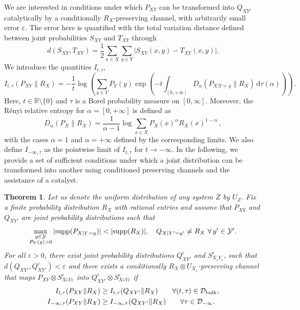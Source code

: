 \documentclass[aps,pra,11pt,onecolumn,nofootinbib,tightenlines]{revtex4-2}
\newtheorem{theorem}{Theorem}[section]
\theoremstyle{definition}
\newcommand{\R}{\mathbb{R}}
\newcommand{\mc}[1]{\mathcal{#1}}
\begin{document}
We are interested in conditions under which \(P_{XY}\) can be transformed into \(Q_{XY'}\) catalytically by a conditionally \(R_X\)-preserving channel, with arbitrarily small error $\varepsilon$.
The error here is quantified with the total variation distance defined between joint probabilities $S_{XY}$ and $T_{XY}$ through
\begin{equation}
d(S_{XY},T_{XY})=\frac{1}{2}\sum_{x\in X}\sum_{y\in Y}\big|S_{XY}(x,y)-T_{XY}(x,y)\big|.
\end{equation}
We introduce the quantities $I_{t,\tau}$,
\begin{equation}
I_{t,\tau}(P_{XY}\|R_X)=-\frac{1}{t}\log{\left(\sum_{y\in Y}P_Y(y)\exp{\left(-t\int_{[0,+\infty]}D_\alpha(P_{X|Y=y}\|R_X)\,\mathrm{d}\tau(\alpha)\right)}\right)} \,.
\end{equation}
Here, $t\in\R\setminus\{0\}$ and $\tau$ is a Borel probability measure on $[0,\infty]$. Moreover, the R\'enyi relative entropy for $\alpha=[0,+\infty]$ is defined as
\begin{equation}
    D_\alpha(P_X\|R_X)=
\frac{1}{\alpha-1}\log{\sum_{x\in X}P_X(x)^\alpha R_X(x)^{1-\alpha}}\,,
\end{equation}
with the cases \(\alpha=1\) and \(\alpha=+\infty\) defined by the corresponding limits.
 We also define \(I_{-\infty,\tau}\) as the pointwise limit of \(I_{t,\tau}\) for \(t \to -\infty\). In the following, we provide a set of sufficient conditions under which a joint distribution can be transformed into another using conditioned preserving channels and the assistance of a catalyst.
\begin{theorem}\label{thm:ConservedClassical}
Let us denote the uniform distribution of any system $Z$ by $U_Z$. Fix a finite probability distribution $R_X$ with rational entries and assume that $P_{XY}$ and $Q_{XY'}$ are joint probability distributions such that
\begin{equation}
\max \limits_{\substack{y \in \mathcal{Y} \\ P_Y( y) > 0}} |{\rm supp}(P_{X|Y=y})|<|{\rm supp}(R_X)|,\quad Q_{X|Y'=y'}\neq R_X\ \forall\,y'\in \mc Y'.
\end{equation}
For all $\varepsilon>0$, there exist joint probability distributions $Q^\varepsilon_{XY'}$ and $S^\varepsilon_{X_\varepsilon Y_\varepsilon}$, such that $d(Q_{XY'},Q^\varepsilon_{XY'})<\varepsilon$ and there exists a conditionally $R_X\otimes U_{X_\varepsilon}$-preserving channel that maps $P_{XY}\otimes S^\varepsilon_{X\varepsilon Y\varepsilon}$ into $Q^\varepsilon_{XY'}\otimes S^\varepsilon_{X\varepsilon Y\varepsilon}$ if
\begin{align}
I_{t,\tau}(P_{XY}\|R_X)&\geq I_{t,\tau}(Q_{XY'}\|R_X)\qquad\forall(t,\tau)\in\mc D_{\rm bulk},\\
I_{-\infty,\tau}(P_{XY}\|R_X)&\geq I_{-\infty,\tau}(Q_{XY'}\|R_X)\qquad \forall\tau\in\mc D_{-\infty}.
\end{align}
\end{theorem}
\end{document}
